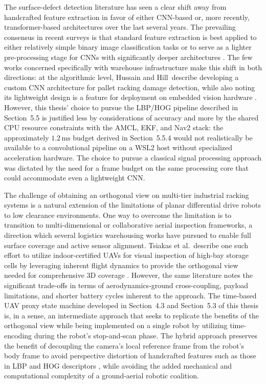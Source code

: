 The surface-defect detection literature has seen a clear shift away from handcrafted feature extraction in favor of either CNN-based or, more recently, transformer-based architectures over the last several years. The prevailing consensus in recent surveys is that standard feature extraction is best applied to either relatively simple binary image classification tasks or to serve as a lighter pre-processing stage for CNNs with significantly deeper architectures \cite{hussain2023custom}. The few works concerned specifically with warehouse infrastructure make this shift in both directions: at the algorithmic level, Hussain and Hill\ describe developing a custom CNN architecture for pallet racking damage detection, while also noting its lightweight design is a feature for deployment on embedded vision hardware \cite{hussain2023custom}. However, this thesis' choice to pursue the LBP/HOG pipeline described in Section~5.5 is justified less by considerations of accuracy and more by the shared CPU resource constraints with the AMCL, EKF, and Nav2 stack: the approximately $1.2\,\text{ms}$ budget derived in Section~5.5.4 would not realistically be available to a convolutional pipeline on a WSL2 host without specialized acceleration hardware. The choice to pursue a classical signal processing approach was dictated by the need for a frame budget on the same processing core that could accommodate even a lightweight CNN.

The challenge of obtaining an orthogonal view on multi-tier industrial racking systems is a natural extension of the limitations of planar differential drive robots to low clearance environments. One way to overcome the limitation is to transition to multi-dimensional or collaborative aerial inspection frameworks, a direction which several logistics warehousing works have pursued to enable full surface coverage and active sensor alignment. Tsiakas et al.\ describe one such effort to utilize indoor-certified UAVs for visual inspection of high-bay storage cells by leveraging inherent flight dynamics to provide the orthogonal view needed for comprehensive 3D coverage \cite{tsiakas2024autonomous}. However, the same literature notes the significant trade-offs in terms of aerodynamics-ground cross-coupling, payload limitations, and shorter battery cycles inherent to the approach. The time-based UAV proxy state machine developed in Section~4.3 and Section~5.3 of this thesis is, in a sense, an intermediate approach that seeks to replicate the benefits of the orthogonal view while being implemented on a single robot by utilizing time-encoding during the robot's stop-and-scan phase. The hybrid approach preserves the benefit of decoupling the camera's local reference frame from the robot's body frame to avoid perspective distortion of handcrafted features such as those in LBP and HOG descriptors \cite{tsiakas2024autonomous}, while avoiding the added mechanical and computational complexity of a ground-aerial robotic coalition.

